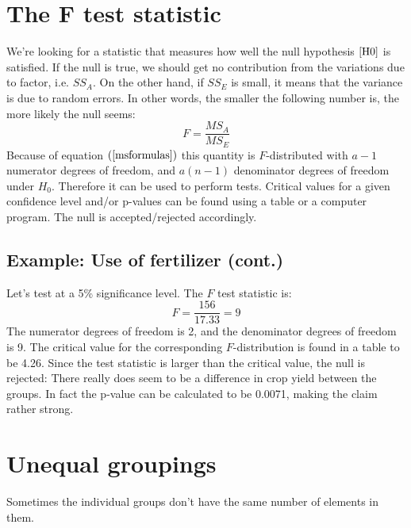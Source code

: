 \documentclass[12pt, a4paper]{article}
\begin{document}
\section{The F test statistic}
We're looking for a statistic that measures how well the null hypothesis $\ref{H0}$ is satisfied. If the null is true, we should get no contribution from the variations due to factor, i.e. $SS_A$. On the other hand, if $SS_E$ is small, it means that the variance is due to random errors. In other words, the smaller the following number is, the more likely the null seems:
\begin{equation}
\label{Fscore}
F=\frac{MS_A}{MS_E}
\end{equation}
Because of equation $(\ref{msformulas})$ this quantity is $F$-distributed with $a-1$ numerator degrees of freedom, and $a(n-1)$ denominator degrees of freedom under $H_0$. Therefore it can be used to perform tests. Critical values for a given confidence level and/or p-values can be found using a table or a computer program. The null is accepted/rejected accordingly.

\subsection{Example: Use of fertilizer (cont.)}
Let's test at a 5\% significance level. The $F$ test statistic is:
\begin{equation}
F=\frac{156}{17.33}=9
\end{equation}
The numerator degrees of freedom is 2, and the denominator degrees of freedom is 9. The critical value for the corresponding $F$-distribution is found in a table to be 4.26. Since the test statistic is larger than the critical value, the null is rejected: There really does seem to be a difference in crop yield between the groups. In fact the p-value can be calculated to be 0.0071, making the claim rather strong.

\section{Unequal groupings}
Sometimes the individual groups don't have the same number of elements in them.
\end{document}
